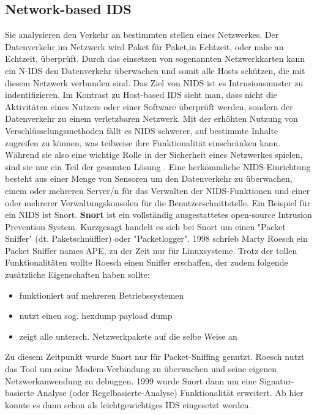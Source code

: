 \subsection{Network-based IDS}
Sie analysieren den Verkehr an bestimmten stellen eines Netzwerkes. Der Datenverkehr im Netzwerk wird Paket für Paket,in Echtzeit, oder nahe an Echtzeit, überprüft. 
Durch das einsetzen von sogenannten Netzwerkkarten kann ein N-IDS den Datenverkehr überwachen und somit alle Hosts schützen, die mit diesem Netzwerk verbunden sind.
Das Ziel von NIDS ist es Intrusionsmuster zu indentifizieren.
Im Kontrast zu Host-based IDS sieht man, dass nicht die Aktivitäten eines Nutzers oder einer Software überprüft werden, sondern der Datenverkehr zu einem verletzbaren Netzwerk.
\cite{IDS_Book_1} \cite{IDS_Book_2}
\bigbreak
Mit der erhöhten Nutzung von Verschlüsselungsmethoden fällt es NIDS schwerer, auf bestimmte Inhalte zugreifen zu können, was teilweise ihre Funktionalität einschränken kann. Während sie also eine wichtige Rolle in der Sicherheit eines Netzwerkes spielen, sind sie nur ein Teil der gesamten Lösung \cite{IDS_Book_2}. Eine herkömmliche NIDS-Einrichtung besteht aus einer Menge von Sensoren um den Datenverkehr zu überwachen, einem oder mehreren Server/n für das Verwalten der NIDS-Funktionen und einer oder mehrerer Verwaltungskonsolen für die Benutzerschnittstelle. \cite{IDS_Book_2}
Ein Beispiel für ein NIDS ist Snort. 
\textbf{Snort} ist ein vollständig ausgestattetes open-source Intrusion Prevention System\cite{snort_url}. Kurzgesagt handelt es sich bei Snort um einen "Packet Sniffer" (dt. Paketschnüffler) oder "Packetlogger". 
1998 schrieb Marty Roesch ein Packet Sniffer names APE, zu der Zeit nur für Linuxsysteme. Trotz der tollen Funktionalitäten wollte Roesch einen Sniffer erschaffen, der zudem folgende zusätzliche Eigenschaften haben sollte:\cite{snort_book_1}

\begin{itemize}
  \item funktioniert auf mehreren Betriebssystemen\bigbreak
  \item nutzt einen sog. hexdump payload dump\bigbreak
  \item zeigt alle untersch. Netzwerkpakete auf die selbe Weise an\bigbreak
\end{itemize}
Zu diesem Zeitpunkt wurde Snort nur für Packet-Sniffing genutzt. Roesch nutzt das Tool um seine Modem-Verbindung zu überwachen und seine eigenen Netzwerkanwendung zu debuggen. 1999 wurde Snort dann um eine Signatur-basierte Analyse (oder Regelbasierte-Analyse) Funktionalität erweitert. Ab hier konnte es dann schon als leichtgewichtiges IDS eingesetzt werden.\cite{snort_book_1}

